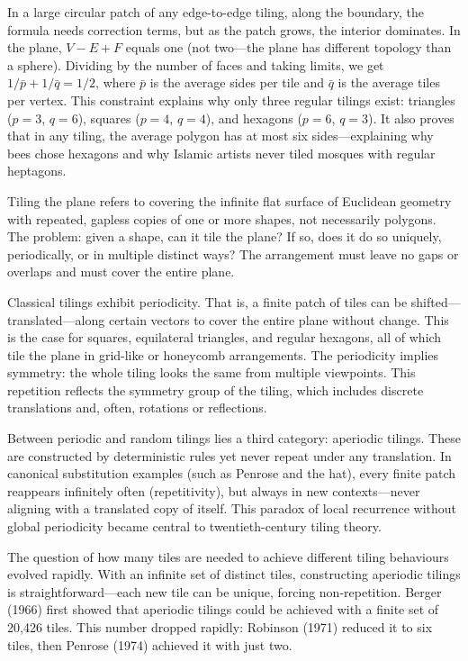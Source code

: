 In a large circular patch of any edge-to-edge tiling, along the boundary, the formula needs correction terms, but as the patch grows, the interior dominates. In the plane, $V - E + F$ equals one (not two—the plane has different topology than a sphere). Dividing by the number of faces and taking limits, we get $1/\bar{p} + 1/\bar{q} = 1/2$, where $\bar{p}$ is the average sides per tile and $\bar{q}$ is the average tiles per vertex. This constraint explains why only three regular tilings exist: triangles ($p=3$, $q=6$), squares ($p=4$, $q=4$), and hexagons ($p=6$, $q=3$). It also proves that in any tiling, the average polygon has at most six sides—explaining why bees chose hexagons and why Islamic artists never tiled mosques with regular heptagons.

Tiling the plane refers to covering the infinite flat surface of Euclidean geometry with repeated, gapless copies of one or more shapes, not necessarily polygons. The problem: given a shape, can it tile the plane? If so, does it do so uniquely, periodically, or in multiple distinct ways? The arrangement must leave no gaps or overlaps and must cover the entire plane.

Classical tilings exhibit periodicity. That is, a finite patch of tiles can be shifted—translated—along certain vectors to cover the entire plane without change. This is the case for squares, equilateral triangles, and regular hexagons, all of which tile the plane in grid-like or honeycomb arrangements. The periodicity implies symmetry: the whole tiling looks the same from multiple viewpoints. This repetition reflects the symmetry group of the tiling, which includes discrete translations and, often, rotations or reflections.

Between periodic and random tilings lies a third category: aperiodic tilings. These are constructed by deterministic rules yet never repeat under any translation. In canonical substitution examples (such as Penrose and the hat), every finite patch reappears infinitely often (repetitivity), but always in new contexts—never aligning with a translated copy of itself. This paradox of local recurrence without global periodicity became central to twentieth-century tiling theory.

The question of how many tiles are needed to achieve different tiling behaviours evolved rapidly. With an infinite set of distinct tiles, constructing aperiodic tilings is straightforward—each new tile can be unique, forcing non-repetition. Berger (1966) first showed that aperiodic tilings could be achieved with a finite set of 20,426 tiles. This number dropped rapidly: Robinson (1971) reduced it to six tiles, then Penrose (1974) achieved it with just two.

